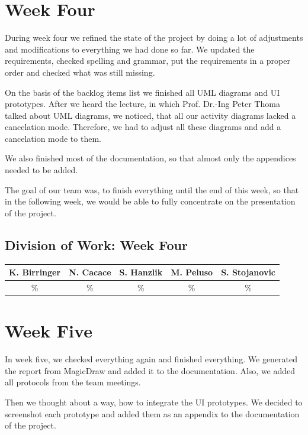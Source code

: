 \documentclass[a4paper, 12pt]{article}
\begin{document}
\section{Week Four}
During week four we refined the state of the project by doing a lot of adjustments and modifications to everything we had done so far.
We updated the requirements, checked spelling and grammar, put the requirements in a proper order and checked what was still missing.

On the basis of the backlog items list we finished all UML diagrams and UI prototypes.
After we heard the lecture, in which Prof. Dr.-Ing Peter Thoma talked about UML diagrams, we  noticed, that all our activity diagrams lacked a cancelation mode. Therefore, we had to adjust all these diagrams and add a cancelation mode to them. 

We also finished most of the documentation, so that almost only the appendices needed to be added.

The goal of our team was, to finish everything until the end of this week, so that in the following week, we would be able to fully concentrate on the presentation of the project.

\subsection{Division of Work: Week Four}

\begin{table}[h]
\centering
\setlength{\tabcolsep}{10pt}
\begin{tabular}{|c|c|c|c|c|}
\hline
K. Birringer & N. Cacace & S. Hanzlik & M. Peluso & S. Stojanovic\\
\hline
\% & \% & \% & \% & \% \\ 
\hline
\end{tabular}
\end{table}
\section{Week Five}
In week five, we checked everything again and finished everything.
We generated the report from MagicDraw and added it to the documentation.
Also, we added all protocols from the team meetings.

Then we thought about a way, how to integrate the UI prototypes. We decided to screenshot each prototype and added them as an appendix to the documentation of the project.
\end{document}
